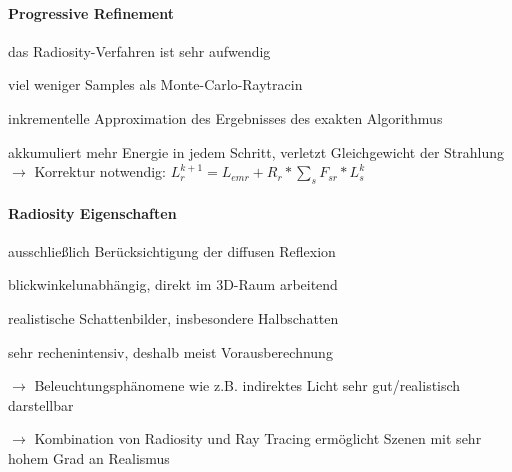 \documentclass[landscape]{article}
\begin{document}
\begin{multicols}{3}
  \paragraph{Progressive Refinement}
  \begin{itemize*}
    \item das Radiosity-Verfahren ist sehr aufwendig
    \item viel weniger Samples als Monte-Carlo-Raytracin
    \item inkrementelle Approximation des Ergebnisses des exakten Algorithmus
    \item akkumuliert mehr Energie in jedem Schritt, verletzt Gleichgewicht der Strahlung $\rightarrow$ Korrektur notwendig:
    $L_r^{k+1}=L_{emr} + R_r*\sum_s F_{sr}* L_s^k$
  \end{itemize*}
  
  \paragraph{Radiosity Eigenschaften}
  \begin{itemize*}
    \item ausschließlich Berücksichtigung der diffusen Reflexion
    \item blickwinkelunabhängig, direkt im 3D-Raum arbeitend
    \item realistische Schattenbilder, insbesondere Halbschatten
    \item sehr rechenintensiv, deshalb meist Vorausberechnung
    \item $\rightarrow$ Beleuchtungsphänomene wie z.B. indirektes Licht sehr gut/realistisch darstellbar
    \item $\rightarrow$ Kombination von Radiosity und Ray Tracing ermöglicht Szenen mit sehr hohem Grad an Realismus
  \end{itemize*}
  
\end{multicols}
\newpage
\end{document}
